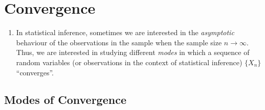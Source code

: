 \section{Convergence}
\label{sect:convergence}
\begin{enumerate}
\item In statistical inference, sometimes we are interested in the
\emph{asymptotic} behaviour of the observations in the sample when the sample
size \(n\to\infty\). Thus, we are interested in studying different \emph{modes}
in which a sequence of random variables (or observations in the context of
statistical inference) \(\{X_n\}\) ``converges''.
\end{enumerate}
\subsection{Modes of Convergence}
